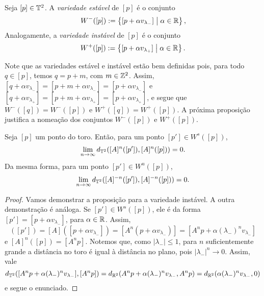 \begin{definition}
Seja $[p] \in \mathbb{T}^2$. A \textit{variedade estável} de $[p]$ é o conjunto
	\begin{equation*}
	W^-([p]) := \left\{{[p + \alpha v_{\lambda_-}]}\;\middle\vert\;{\alpha \in \mathbb{R}}\right\},
	\end{equation*}
Analogamente, a \textit{variedade instável} de $[p]$ é o conjunto
	\begin{equation*}
	W^+([p]) := \left\{{[p + \alpha v_{\lambda_+}]}\;\middle\vert\;{\alpha \in \mathbb{R}}\right\}.
	\end{equation*}
\end{definition}

Note que as variedades estável e instável estão bem definidas pois, para todo $q \in [p]$, temos $q = p + m$, com $m \in \mathbb{Z}^2$. Assim, $[q + \alpha v_{\lambda_-}] = [p + m + \alpha v_{\lambda_-}] = [p + \alpha v_{\lambda_-}]$ e $[q + \alpha v_{\lambda_+}] = [p + m + \alpha v_{\lambda_+}] = [p + \alpha v_{\lambda_+}]$, e segue que $W^-([q]) = W^-([p])$ e $W^+([q]) = W^+([p])$. A próxima proposição justifica a nomeação dos conjuntos $W^-([p])$ e $W^+([p])$.

\begin{theorem}
	Seja $[p]$ um ponto do toro. Então, para um ponto $[p'] \in W^s([p])$,
	\begin{equation*}
	\lim_{n \to \infty} d_{\mathbb{T}^2}([A]^n([p']),[A]^n([p])) = 0.
	\end{equation*}
Da mesma forma, para um ponto $[p'] \in W^u([p])$,
	\begin{equation*}
	\lim_{n \to \infty} d_{\mathbb{T}^2}([A]^{-n}([p']),[A]^{-n}([p])) = 0.
	\end{equation*}
\end{theorem}
\begin{proof}
	Vamos demonstrar a proposição para a variedade instável. A outra demonstração é análoga. Se $[p'] \in W^s([p])$, ele é da forma $[p'] = [p + \alpha v_{\lambda_-}]$, para $\alpha \in \mathbb{R}$. Assim,
	\begin{equation*}
	[A]([p']) = [A]([p + \alpha v_{\lambda_-}]) = [A^n(p + \alpha v_{\lambda_-})] = [A^np + \alpha (\lambda_-)^n v_{\lambda_-}]
	\end{equation*}
e $[A]^n([p]) = [A^np]$. Notemos que, como $|\lambda_-| \leq 1$, para $n$ suficientemente grande a distância no toro é igual à distância no plano, pois $|\lambda_-|^n \rightarrow 0$. Assim, vale
	\begin{equation*}
	d_{\mathbb{T}^2}([A^np + \alpha (\lambda_-)^n v_{\lambda_-}],[A^np]) = d_{\mathbb{R}^2}(A^np + \alpha (\lambda_-)^n v_{\lambda_-},A^np) = d_{\mathbb{R}^2}(\alpha (\lambda_-)^n v_{\lambda_-},0)
	\end{equation*}
e segue o enunciado.
\end{proof}

